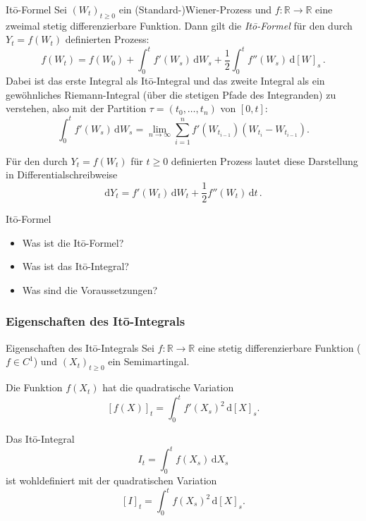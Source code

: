 \begin{defi}{Itō-Formel}
    Sei $(W_{t})_{t\geq 0}$ ein (Standard-)Wiener-Prozess und $f\colon \mathbb{R} \to \mathbb{R}$ eine zweimal stetig differenzierbare Funktion.
    Dann gilt die \emph{Itō-Formel} für den durch $Y_{t}=f(W_{t})$ definierten Prozess:
    \[
        f(W_{t})=f(W_{0})+\int_{0}^{t}f'(W_{s})\,{\mathrm{d}}W_{s}+{\frac{1}{2}}\int_{0}^{t}f''(W_{s})\,{\mathrm{d}}[W]_s\,.
    \]
    Dabei ist das erste Integral als Itō-Integral und das zweite Integral als ein gewöhnliches Riemann-Integral (über die stetigen Pfade des Integranden) zu verstehen, also mit der Partition $\tau = (t_{0},\dots ,t_{n})$ von $[0,t]$:
    \[
        \int_{0}^{t}f'(W_{s})\,{\mathrm{d}}W_{s} = \lim_{n\to \infty }\sum_{i=1}^{n}f'(W_{t_{i-1}})(W_{t_{i}}-W_{t_{i-1}}).
    \]

    Für den durch $Y_{t}=f(W_{t})$ für $t\geq 0$ definierten Prozess lautet diese Darstellung in Differentialschreibweise
    \[
        \mathrm{d}Y_{t}=f'(W_{t})\,{\mathrm{d}}W_{t}+{\frac{1}{2}}f''(W_{t})\,{\mathrm{d}}t\,.
    \]
\end{defi}

\begin{info}{Itō-Formel}
    \begin{itemize}
        \item Was ist die Itō-Formel?
        \item Was ist das Itō-Integral?
        \item Was sind die Voraussetzungen?
    \end{itemize}
\end{info}

\subsubsection{Eigenschaften des Itō-Integrals}

\begin{defi}{Eigenschaften des Itō-Integrals}
    Sei $f\colon \mathbb{R} \to \mathbb{R}$ eine stetig differenzierbare Funktion ($f \in C^{1}$) und $(X_{t})_{t\geq 0}$ ein Semimartingal.

    Die Funktion $f(X_{t})$ hat die quadratische Variation
    \[
        [f(X)]_{t} = \int_{0}^{t} f'(X_{s})^{2}\,{\mathrm{d}}[X]_{s}.
    \]

    Das Itō-Integral
    \[
        I_{t} = \int_{0}^{t} f(X_{s})\,{\mathrm{d}}X_{s}
    \]
    ist wohldefiniert mit der quadratischen Variation
    \[
        [I]_{t} = \int_{0}^{t} f(X_{s})^{2}\,{\mathrm{d}}[X]_{s}.
    \]
\end{defi}

